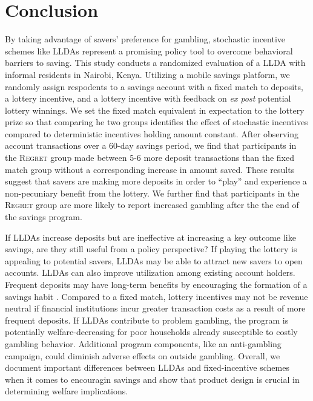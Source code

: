 \documentclass[12pt]{article}
\begin{document}
\section{Conclusion} \label{sec:conclusion}

		By taking advantage of savers' preference for gambling, stochastic incentive schemes like LLDAs represent a promising policy tool to overcome behavioral barriers to saving. This study conducts a randomized evaluation of a LLDA with informal residents in Nairobi, Kenya. Utilizing a mobile savings platform, we randomly assign respodents to a savings account with a fixed match to deposits, a lottery incentive, and a lottery incentive with feedback on \textit{ex post} potential lottery winnings. We set the fixed match equivalent in expectation to the lottery prize so that comparing he two groups identifies the effect of stochastic incentives compared to deterministic incentives holding amount constant. After observing account transactions over a 60-day savings period, we find that participants in the \textsc{Regret} group made between 5-6 more deposit transactions than the fixed match group without a corresponding increase in amount saved. These results suggest that savers are making more deposits in order to ``play'' and experience a non-pecuniary benefit from the lottery. We further find that participants in the \textsc{Regret} group are more likely to report increased gambling after the the end of the savings program.

		If LLDAs increase deposits but are ineffective at increasing a key outcome like savings, are they still useful from a policy perspective? If playing the lottery is appealing to potential savers, LLDAs may be able to attract new savers to open  accounts. LLDAs can also improve utilization among existing account holders. Frequent deposits may have long-term benefits by encouraging the formation of a savings habit . Compared to a fixed match, lottery incentives may not be revenue neutral if financial institutions incur greater transaction costs as a result of more frequent deposits. If LLDAs contribute to problem gambling, the program is potentially welfare-decreasing for poor households already susceptible to costly gambling behavior. Additional program components, like an anti-gambling campaign, could diminish adverse effects on outside gambling. Overall, we document important differences between LLDAs and fixed-incentive schemes when it comes to encouragin savings and show that product design is crucial in determining welfare implications.
\end{document}
